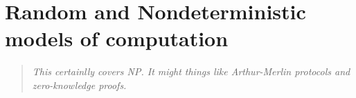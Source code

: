 \section{Random and Nondeterministic models of computation}
\begin{quotation}\textit{
This certainlly covers NP.
It might things like Arthur-Merlin protocols and zero-knowledge proofs.
}\end{quotation}


